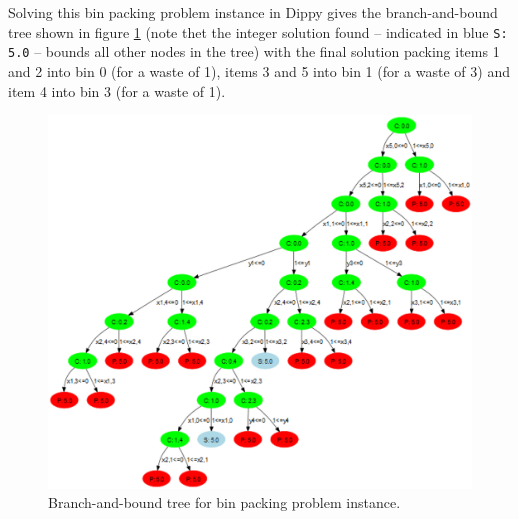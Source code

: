 Solving this bin packing problem instance in Dippy gives the branch-and-bound tree shown in figure \ref{fig:bpp_tree1} (note thet the integer solution found -- indicated in blue \lstinline{S: 5.0} -- bounds all other nodes in the tree) with the final solution packing items 1 and 2 into bin 0 (for a waste of 1), items 3 and 5 into bin 1 (for a waste of 3) and item 4 into bin 3 (for a waste of 1).
\begin{figure}[htp]
\begin{center}
\includegraphics[scale=0.16]{img/bpp_tree1.eps}
\end{center}
\caption{Branch-and-bound tree for bin packing problem instance.} \label{fig:bpp_tree1}
\end{figure}
